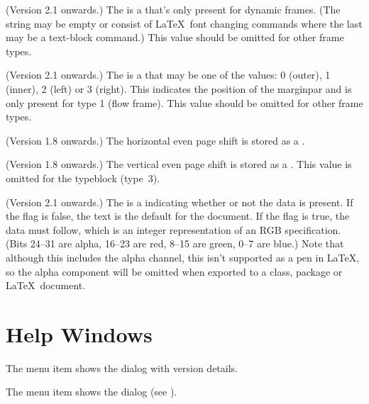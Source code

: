 \begin{numbered}
\item (Version 2.1 onwards.) The  is a
 that's only present for dynamic frames. (The string
may be empty or consist of \LaTeX\ font
changing commands where the last may be a text-block command.)
This value should be omitted for other frame types.

\item (Version 2.1 onwards.) The  is a 
that may be one of the values: 0 (outer), 1 (inner), 2 (left) or 3
(right). This indicates the position of the marginpar and is only
present for type 1 (flow frame).
This value should be omitted for other frame types.

\item (Version 1.8 onwards.) The horizontal even page shift
 is stored as a .

\item (Version 1.8 onwards.) The vertical even page shift
 is stored as a . This value is
omitted for the \gls{typeblock} (type~3).

\item (Version 2.1 onwards.) The  is a
 indicating whether or not the  data is
present. If the flag is false, the text  is the default
for the document. If the flag is true, the  data must
follow, which is an integer representation of an RGB
 specification.  (Bits 24--31 are alpha, 16--23 are red,
8--15 are green, 0--7 are blue.) Note that although this includes
the alpha channel, this isn't supported as a pen  in
\LaTeX, so the alpha component will be omitted when exported to a class, package or
\LaTeX\ document.

\end{numbered}%

\chapter{Help Windows}
\label{sec:helpwindows}


The  menu item shows the 
dialog with version details.


The  menu item shows the 
dialog (see ).

